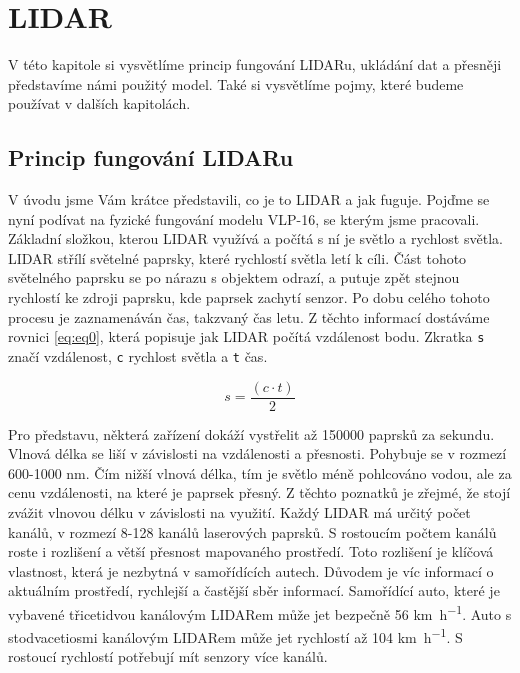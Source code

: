 \documentclass[czech,bachelor,dept420,male,cpdeclaration]{diploma}
\begin{document}
\section{LIDAR}
V této kapitole si vysvětlíme princip fungování LIDARu, ukládání dat a přesněji představíme námi použitý model. Také si vysvětlíme pojmy, které budeme používat v dalších kapitolách.
\subsection{Princip fungování LIDARu}
V úvodu jsme Vám krátce představili, co je to LIDAR a jak fuguje. Pojďme se nyní podívat na fyzické fungování modelu VLP-16, se kterým jsme pracovali.  
Základní složkou, kterou LIDAR využívá a počítá s ní je světlo a rychlost světla. LIDAR střílí světelné paprsky, které rychlostí světla letí k cíli. Část tohoto světelného paprsku se po nárazu s objektem odrazí, a putuje zpět stejnou rychlostí ke zdroji paprsku, kde paprsek zachytí senzor. Po dobu celého tohoto procesu je zaznamenáván čas, takzvaný čas letu. Z těchto informací dostáváme rovnici \eqref{eq:eq0}, která popisuje jak LIDAR počítá vzdálenost bodu. Zkratka \texttt{s} značí vzdálenost, \texttt{c} rychlost světla a \texttt{t} čas.

\begin{equation}
		s = \frac{\left ( c \cdot t \right)}{2} 
\label{eq:eq0}
\end{equation}

Pro představu, některá zařízení dokáží vystřelit až \num{150000} paprsků za sekundu. Vlnová délka se liší v závislosti na vzdálenosti a přesnosti. Pohybuje se v rozmezí 600-1000 \si{\nano\metre}. Čím nižší vlnová délka, tím je světlo méně pohlcováno vodou, ale za cenu vzdálenosti, na které je paprsek přesný. Z těchto poznatků je zřejmé, že stojí zvážit vlnovou délku v závislosti na využití. 
Každý LIDAR má určitý počet kanálů, v rozmezí 8-128 kanálů laserových paprsků. S rostoucím počtem kanálů roste i rozlišení a větší přesnost mapovaného prostředí. Toto rozlišení je klíčová vlastnost, která je nezbytná v samořídících autech. Důvodem je víc informací o aktuálním prostředí, rychlejší a častější sběr informací. Samořídící auto, které je vybavené třicetidvou kanálovým LIDARem může jet bezpečně \num{56} \si{\km\per\hour}. Auto s stodvacetiosmi kanálovým LIDARem může jet rychlostí až \num{104} \si{\km\per\hour}. S rostoucí rychlostí potřebují mít senzory více kanálů.
\end{document}
